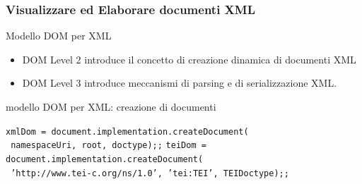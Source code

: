 \begin{frame}
    \frametitle{Visualizzare ed Elaborare documenti XML}
    \addtocounter{nframe}{1}
    

     \begin{block}{Modello DOM per XML}
        \begin{itemize}
            \item DOM Level 2 introduce il concetto di creazione dinamica di documenti XML
            \item DOM Level 3 introduce meccanismi di parsing e di serializzazione XML.
        \end{itemize}
        
     \end{block}

     \begin{block}{modello DOM per XML: creazione di documenti}
       
       \texttt{xmlDom = document.implementation.createDocument(}
        \\\texttt{   namespaceUri, root, doctype);;} 
        \texttt{teiDom = document.implementation.createDocument(}
        \\\texttt{   'http://www.tei-c.org/ns/1.0', 'tei:TEI', TEIDoctype);;} 
       
     \end{block}
     
\end{frame}


